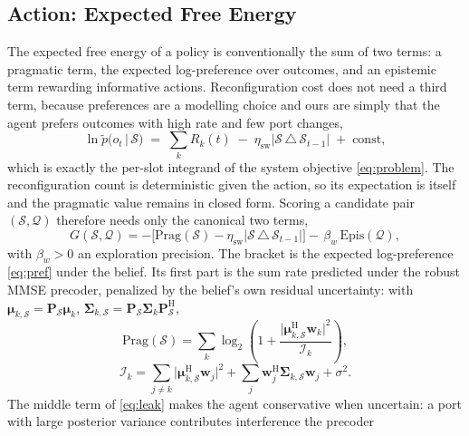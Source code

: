 \documentclass[journal]{IEEEtran}
\newcommand{\bP}{\mathbf{P}}
\newcommand{\bw}{\mathbf{w}}
\newcommand{\bmu}{\boldsymbol{\mu}}
\newcommand{\bSig}{\boldsymbol{\Sigma}}
\begin{document}
\subsection{Action: Expected Free Energy}
The expected free energy of a policy is conventionally the sum of two terms: a
pragmatic term, the expected log-preference over outcomes, and an epistemic
term rewarding informative actions. Reconfiguration cost does not need a third
term, because preferences are a modelling choice and ours are simply that the
agent prefers outcomes with high rate and few port changes,
\begin{equation}
  \ln\tilde{p}\big(o_t\,|\,\mathcal{S}\big) \;=\;
    \sum_{k}R_k(t) \;-\; \eta_{\mathrm{sw}}
    \big|\mathcal{S}\,\triangle\,\mathcal{S}_{t-1}\big| \;+\; \mathrm{const},
  \label{eq:pref}
\end{equation}
which is exactly the per-slot integrand of the system objective
\eqref{eq:problem}. The reconfiguration count is deterministic given the
action, so its expectation is itself and the pragmatic value remains in closed
form. Scoring a candidate pair $(\mathcal{S},\mathcal{Q})$ therefore needs only
the canonical two terms,
\begin{equation}
  G(\mathcal{S},\mathcal{Q}) =
   -\Big[\mathrm{Prag}(\mathcal{S})
     -\eta_{\mathrm{sw}}\big|\mathcal{S}\,\triangle\,\mathcal{S}_{t-1}\big|\Big]
   -\,\beta_w\,\mathrm{Epis}(\mathcal{Q}),
  \label{eq:efe}
\end{equation}
with $\beta_w>0$ an exploration precision. The bracket is the expected
log-preference \eqref{eq:pref} under the belief. Its first part is the sum rate
predicted under the robust MMSE precoder, penalized by the belief's own
residual uncertainty: with
$\bmu_{k,\mathcal{S}}=\bP_{\mathcal{S}}\bmu_k$,
$\bSig_{k,\mathcal{S}}=\bP_{\mathcal{S}}\bSig_k\bP_{\mathcal{S}}^{\mathrm{H}}$,
\begin{equation}
  \mathrm{Prag}(\mathcal{S}) = \sum_{k}
    \log_2\!\left(1+
    \frac{\big|\bmu_{k,\mathcal{S}}^{\mathrm{H}}\bw_k\big|^2}{\mathcal{I}_k}
    \right),
  \label{eq:prag}
\end{equation}
\begin{equation}
  \mathcal{I}_k =
    \sum_{j\neq k}\big|\bmu_{k,\mathcal{S}}^{\mathrm{H}}\bw_j\big|^2
    + \sum_{j}\bw_j^{\mathrm{H}}\bSig_{k,\mathcal{S}}\bw_j
    + \sigma^2 .
  \label{eq:leak}
\end{equation}
The middle term of \eqref{eq:leak} makes the agent conservative when uncertain:
a port with large posterior variance contributes interference the precoder
\end{document}
